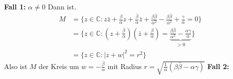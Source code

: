 \begin{problem*}[1]
\begin{itemize}
	\textbf{Fall 1:} $ \alpha \neq 0$ Dann ist.
	\begin{align*}
	M &= \{ z \in \mathbb{C} : z \bar{z} + \frac{\beta}{\alpha}z + \frac{\bar{\beta}}{\alpha} \bar{z} + \frac{\beta \bar{\beta}}{\alpha^2} - \frac{\beta \bar{\beta}}{\alpha^2} + \frac{\gamma}{\alpha} = 0\} \\
	&= \{ z \in \mathbb{C} : (z + \frac{\bar{\beta}}{\alpha})(\bar{z} + \frac{\beta}{\alpha}) = \underbrace{\frac{\beta \bar{\beta}}{\alpha^2} - \frac{\alpha \gamma}{\alpha}}_{ > 0 } \} \\
	&= \{ z \in \mathbb{C} : \vert z + w \vert^2 = r^2\}
	\end{align*}
	Also ist $ M $ der Kreis um $ w = -\frac{\bar{\beta}}{\alpha}$ mit Radius $ r = \sqrt{ \frac{1}{\alpha} (\beta \bar{\beta} - \alpha \gamma) }$
	\textbf{Fall 2:}
\end{itemize}
\end{problem*}

